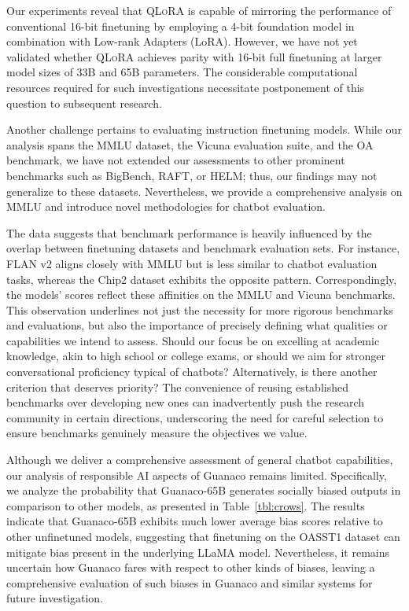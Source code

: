Our experiments reveal that \textsc{QLoRA} is capable of mirroring the performance of conventional 16-bit finetuning by employing a 4-bit foundation model in combination with Low-rank Adapters (LoRA). However, we have not yet validated whether \textsc{QLoRA} achieves parity with 16-bit full finetuning at larger model sizes of 33B and 65B parameters. The considerable computational resources required for such investigations necessitate postponement of this question to subsequent research.

Another challenge pertains to evaluating instruction finetuning models. While our analysis spans the MMLU dataset, the Vicuna evaluation suite, and the OA benchmark, we have not extended our assessments to other prominent benchmarks such as BigBench, RAFT, or HELM; thus, our findings may not generalize to these datasets. Nevertheless, we provide a comprehensive analysis on MMLU and introduce novel methodologies for chatbot evaluation.

The data suggests that benchmark performance is heavily influenced by the overlap between finetuning datasets and benchmark evaluation sets. For instance, FLAN v2 aligns closely with MMLU but is less similar to chatbot evaluation tasks, whereas the Chip2 dataset exhibits the opposite pattern. Correspondingly, the models’ scores reflect these affinities on the MMLU and Vicuna benchmarks. This observation underlines not just the necessity for more rigorous benchmarks and evaluations, but also the importance of precisely defining what qualities or capabilities we intend to assess. Should our focus be on excelling at academic knowledge, akin to high school or college exams, or should we aim for stronger conversational proficiency typical of chatbots? Alternatively, is there another criterion that deserves priority? The convenience of reusing established benchmarks over developing new ones can inadvertently push the research community in certain directions, underscoring the need for careful selection to ensure benchmarks genuinely measure the objectives we value.

Although we deliver a comprehensive assessment of general chatbot capabilities, our analysis of responsible AI aspects of {Guanaco} remains limited. Specifically, we analyze the probability that {Guanaco}-65B generates socially biased outputs in comparison to other models, as presented in Table~\ref{tbl:crows}. The results indicate that {Guanaco}-65B exhibits much lower average bias scores relative to other unfinetuned models, suggesting that finetuning on the OASST1 dataset can mitigate bias present in the underlying LLaMA model. Nevertheless, it remains uncertain how {Guanaco} fares with respect to other kinds of biases, leaving a comprehensive evaluation of such biases in {Guanaco} and similar systems for future investigation.

